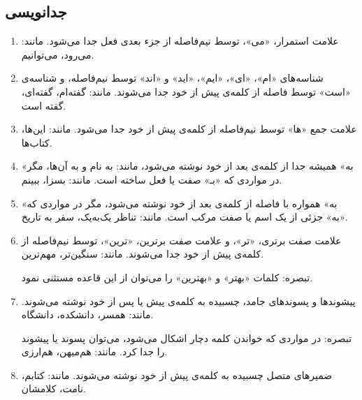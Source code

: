 \subsection{جدانویسی}

\begin{enumerate}


\item
علامت استمرار، «می»، توسط نیم‌فاصله از جزء‌ بعدی فعل جدا می‌شود. مانند: می‌رود، می‌توانیم.
\item
شناسه‌های «ام»، «ای»، «ایم»، «اید» و «اند» توسط نیم‌فاصله، و شناسه‌ی «است» توسط فاصله از کلمه‌ی پیش از خود جدا می‌شوند. مانند: گفته‌ام، گفته‌ای، گفته است.
\item
علامت جمع «ها» توسط نیم‌فاصله از کلمه‌ی پیش از خود جدا می‌شود. مانند: این‌ها، کتاب‌ها.
\item
«به» همیشه جدا از کلمه‌ی بعد از خود نوشته می‌شود، مانند: به‌ نام و به آن‌ها، مگر در مواردی که «بـ» صفت یا فعل ساخته است. مانند: بسزا، ببینم.
\item
«به» همواره با فاصله از کلمه‌ی بعد از خود نوشته می‌شود، مگر در مواردی که «به» جزئی از یک اسم یا صفت مرکب است. مانند: تناظر یک‌به‌یک، سفر به تاریخ.
%
%
%

%

\item
علامت صفت برتری، «تر»، و علامت صفت برترین، «ترین»، توسط نیم‌فاصله از کلمه‌ی پیش از خود جدا می‌شوند.
مانند: سنگین‌تر، مهم‌ترین.

        تبصره‌: کلمات «بهتر» و «بهترین» را می‌توان از این قاعده مستثنی نمود.

\item
پیشوندها و پسوندهای جامد، چسبیده به کلمه‌ی پیش یا پس از خود نوشته می‌شوند. مانند: همسر، دانشکده، دانشگاه.

        تبصره‌: در مواردی که خواندن کلمه دچار اشکال می‌شود، می‌توان پسوند یا پیشوند را جدا کرد. مانند: هم‌میهن، هم‌ارزی.

\item
ضمیرهای متصل چسبیده به کلمه‌ی پیش‌ از خود نوشته می‌شوند. مانند: کتابم، نامت، کلامشان.

\end{enumerate}


